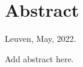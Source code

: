 \chapter*{Abstract\hfill} 

\begin{flushright}
Leuven, May, 2022.
\end{flushright}

Add abstract here.
